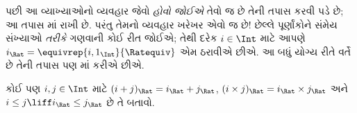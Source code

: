 \documentclass[../../../include/open-logic-section]{subfiles}
\begin{document}
પછી આ વ્યાખ્યાઓનો વ્યવહાર જેવો \emph{હોવો જોઈએ} તેવો જ છે તેની
તપાસ કરવી પડે છે; આ તપાસ માં રાખી છે. પરંતુ તેમનો
વ્યવહાર ખરેખર એવો જ છે!{} છેલ્લે પૂર્ણાંકોને સંમેય સંખ્યાઓ
\emph{તરીકે} ગણવાની કોઈ રીત જોઈએ; તેથી દરેક $i \in \Int$ માટે આપણે
$i_\Rat = \equivrep{i, 1_\Int}{\Ratequiv}$ એમ ઠરાવીએ છીએ. આ બધું
યોગ્ય રીતે વર્તે છે તેની તપાસ પણ માં કરીએ છીએ.

\begin{prob}
કોઈ પણ $i, j \in \Int$ માટે $(i + j)_\Rat = i_\Rat+ j_\Rat$,
$(i \times j)_\Rat = i_\Rat \times j_\Rat$ અને
$i \leq j \liff i_\Rat \leq j_\Rat$ છે તે બતાવો.
\end{prob}
\end{document}
